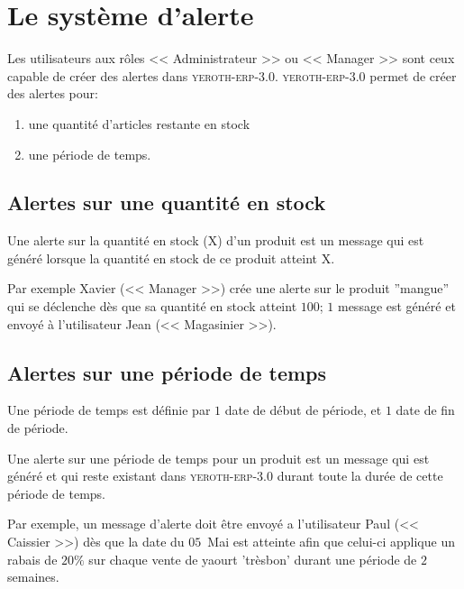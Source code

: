 \documentclass[a4paper, 10pt, twocolumn]{article}
\newcommand{\yeren}{\textsc{yeroth-erp-3.0}\xspace}
\newcommand{\manager}{<< Manager >>\xspace}
\newcommand{\caissier}{<< Caissier >>\xspace}
\newcommand{\administrateur}{<< Administrateur >>\xspace}
\newcommand{\magasinier}{<< Magasinier >>\xspace}
\begin{document}
\vspace{-1em}
\section{Le syst\`eme d'alerte}
\vspace{-0.5em}
Les utilisateurs aux r\^oles \administrateur ou
\manager sont ceux capable de cr\'eer des
alertes dans \yeren.
\yeren permet  de cr\'eer des alertes pour:
\begin{enumerate}[1)]
	\itemsep -0.5em
	\item une quantit\'e d'articles restante en stock
	\item une p\'eriode de temps.
\end{enumerate}

\vspace{-1em}

\subsection{Alertes sur une quantit\'e en stock}
\vspace{-0.1em}
Une alerte sur la quantit\'e en stock (X) d'un produit
est un message qui est g\'en\'er\'e lorsque la
quantit\'e en stock de ce produit atteint X.

Par exemple Xavier (\manager) cr\'ee une alerte sur le
produit ''mangue'' qui se d\'eclenche d\`es que sa quantit\'e
en stock atteint $100$; $1$ message est g\'en\'er\'e et
envoy\'e \`a l'utilisateur Jean (\magasinier).

\vspace{-1em}

\subsection{Alertes sur une p\'eriode de temps}
\vspace{-0.1em}
Une p\'eriode de temps est d\'efinie par $1$ date
de d\'ebut de p\'eriode, et $1$ date de fin
de p\'eriode.

Une alerte sur une p\'eriode de temps pour un
produit est un message qui est g\'en\'er\'e et 
qui reste existant dans \yeren durant toute la
dur\'ee de cette p\'eriode de temps.

Par exemple, un message d'alerte doit \^etre envoy\'e
a l'utilisateur Paul (\caissier) d\`es que
la date du $05$~Mai est atteinte afin que celui-ci
applique un rabais de $20\%$ sur chaque vente de
yaourt 'tr\`esbon' durant une p\'eriode de $2$ semaines.
\end{document}
